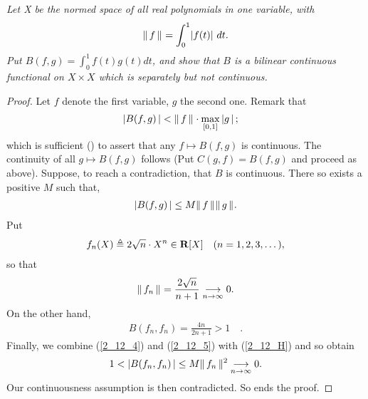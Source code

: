 \textit{%
Let X be the normed space of all real polynomials in one variable, with %
%
  \begin{align*}
    \| \,f \, \|_{}=\int_0^1\lvert f(t)\rvert\ dt.
\end{align*}
%
Put  %
  $B(f, g)=\int _0^1 f(t)g(t) dt $, %
%
and show that $B$ is a bilinear continuous functional on $X\times X$ %
which is separately but not continuous.
}
\begin{proof} Let $f$ denote the first variable, $g$ the second one. %
Remark that %
%
  \begin{align}\label{2_12_2}
    \left\lvert B(f, g) \,\right\rvert 
      & < \| \,f \, \|_{} \cdot \max_{[0,1]} \left\lvert g \,\right\rvert ; 
  \end{align}
%
which is sufficient () to assert that any %
%
  $f \mapsto B(f, g)$ 
%
is continuous. The continuity of all %
%
  $g \mapsto B(f,g)$ %
%
follows (Put $C(g, f) = B(f, g)$ and proceed as above). %
Suppose, to reach a contradiction, that $B$ is continuous. %
There so exists a positive $M$ such that, 
%
  \begin{align}\label{2_12_H}
    \left\lvert B(f, g) \,\right\rvert \leq M \| \,f \, \|_{}\| \,g \, \|_{}.
  \end{align}
%
Put %
%
  \begin{align}\label{2_12_3}
    f_n(X)\triangleq 2 \sqrt{n}\cdot X^{n}\in {\mathbf R}[X] \quad (n=1, 2, 3, \dots), 
  \end{align}
%
so that 
%
  \begin{align}\label{2_12_4}
    \| \,f_n \, \|_{} = \frac{2 \sqrt{n}}{n+1} \underset{n\to \infty}{\longrightarrow}0.
  \end{align}
%
On the other hand,
%
  \begin{align}\label{2_12_5}
    B(f_n, f_n)= \frac{4 n}{2n+1} > 1 \quad .
  \end{align}
%
Finally, we combine %
%
  (\ref{2_12_4}) and (\ref{2_12_5}) with (\ref{2_12_H}) %
%
and so obtain
\begin{align}
 1 < \left\lvert B(f_n, f_n) \,\right\rvert \leq  M \| \,f_n \, \|_{}^2  \underset{n\to \infty}{\longrightarrow} 0.
\end{align}
Our continuousness assumption is then contradicted. So ends the proof.
\end{proof}
